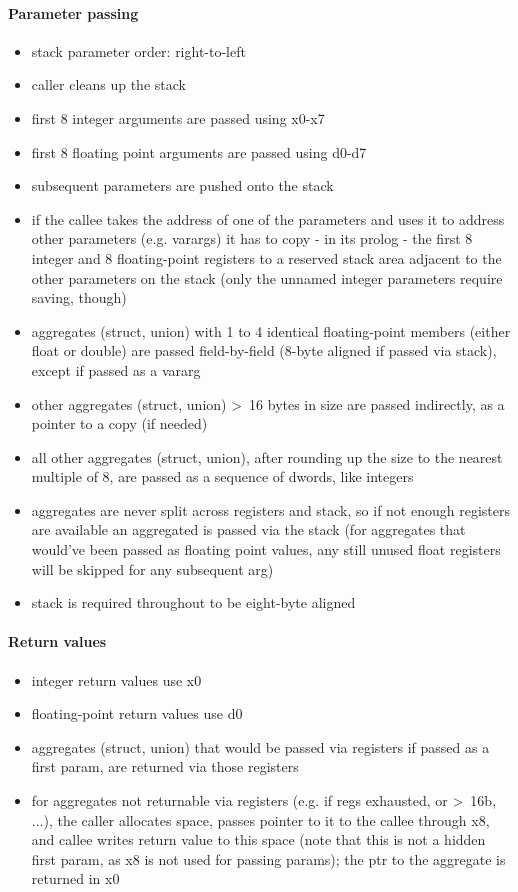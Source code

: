 \paragraph{Parameter passing}

\begin{itemize}
\item stack parameter order: right-to-left
\item caller cleans up the stack
\item first 8 integer arguments are passed using x0-x7
\item first 8 floating point arguments are passed using d0-d7
\item subsequent parameters are pushed onto the stack
\item if the callee takes the address of one of the parameters and uses it to address other parameters (e.g. varargs) it has to copy - in its prolog - the first 8 integer
and 8 floating-point registers to a reserved stack area adjacent to the other parameters on the stack (only the unnamed integer parameters require saving, though)
\item aggregates (struct, union) with 1 to 4 identical floating-point members (either float or double) are passed field-by-field (8-byte aligned if passed via stack), except if passed as a vararg
\item other aggregates (struct, union) \textgreater\ 16 bytes in size are passed indirectly, as a pointer to a copy (if needed)
\item all other aggregates (struct, union), after rounding up the size to the nearest multiple of 8, are passed as a sequence of dwords, like integers
\item aggregates are never split across registers and stack, so if not enough registers are available an aggregated is passed via the stack (for aggregates that
would've been passed as floating point values, any still unused float registers will be skipped for any subsequent arg)
\item stack is required throughout to be eight-byte aligned
\end{itemize}

\paragraph{Return values}

\begin{itemize}
\item integer return values use x0
\item floating-point return values use d0
\item aggregates (struct, union) that would be passed via registers if passed as a first param, are returned via those registers
\item for aggregates not returnable via registers (e.g. if regs exhausted, or \textgreater\ 16b, ...), the caller allocates space, passes pointer to it to the callee through
x8, and callee writes return value to this space (note that this is not a hidden first param, as x8 is not used for passing params); the ptr to the aggregate is returned in x0
\end{itemize}

